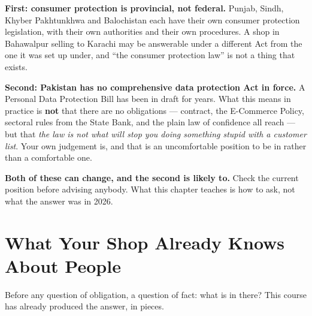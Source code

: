 \begin{alertbox}
\textbf{First: consumer protection is provincial, not federal.} Punjab, Sindh,
Khyber Pakhtunkhwa and Balochistan each have their own consumer protection
legislation, with their own authorities and their own procedures. A shop in
Bahawalpur selling to Karachi may be answerable under a different Act from the
one it was set up under, and ``the consumer protection law'' is not a thing
that exists.

\smallskip
\textbf{Second: Pakistan has no comprehensive data protection Act in force.} A
Personal Data Protection Bill has been in draft for years. What this means in
practice is \textbf{not} that there are no obligations --- contract, the
E-Commerce Policy, sectoral rules from the State Bank, and the plain law of
confidence all reach --- but that \emph{the law is not what will stop you doing
something stupid with a customer list}. Your own judgement is, and that is an
uncomfortable position to be in rather than a comfortable one.

\smallskip
\textbf{Both of these can change, and the second is likely to.} Check the
current position before advising anybody. What this chapter teaches is how to
ask, not what the answer was in 2026.
\end{alertbox}

\section{What Your Shop Already Knows About People}

Before any question of obligation, a question of fact: what is in there? This
course has already produced the answer, in pieces.

